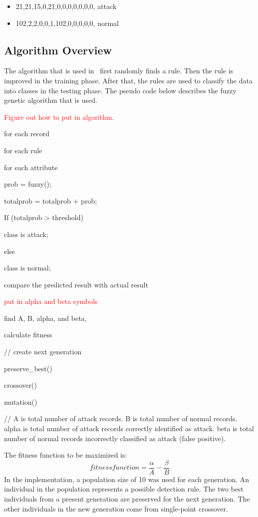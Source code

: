 \documentclass{sig-alternate}
\newcommand{\mycomment}[1]{\textcolor{red}{#1}}
\begin{document}
\begin{itemize}
\item 21,21,15,0,21,0,0,0,0,0,0,0, attack
\item 102,2,2,0,0,1,102,0,0,0,0,0, normal
\end{itemize}




\subsection{Algorithm Overview}
The algorithm that is used in~\cite{6496342, 6559603} first randomly finds a rule. Then the rule is improved in the training phase. After that, the rules are used to classify the data into classes in the testing phase. The pseudo code below describes the fuzzy genetic algorithm that is used. 

\mycomment{Figure out how to put in algorithm.}

for each record

   for each rule

      for each attribute
         
         prob = fuzzy();

         totalprob = totalprob + prob;
      
      If (totalprob > threshold)

         class is attack;

      else

         class is normal;


      compare the predicted result with actual result

\mycomment{put in alpha and beta symbols}

      find A, B, alpha, and beta,


   calculate fitness

   // create next generation

   preserve\_best()

   crossover()

   mutation()


// A is total number of attack records. B is total number of normal records. alpha is total number of attack records correctly identified as attack. beta is total number of normal records incorrectly classified as attack (false positive).




The fitness function to be maximized is:
\begin{equation*}
fitness function = \frac{\alpha}{A} - \frac{\beta}{B}
\end{equation*}
In the implementation, a population size of 10 was used for each generation. An individual in the population represents a possible detection rule. The two best individuals from a present generation are preserved for the next generation. The other individuals in the new generation come from single-point crossover.
\end{document}
